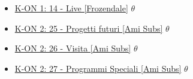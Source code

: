 \begin{itemize}
				\item \href{https://mega.nz/#!xlcAUIoD!Nb41nOrmFOCD4II2LrOPH6mZMtVmeiWKCxQsop_9aHE} {K-ON 1: 14 - Live [Frozendale]}  $\theta$   \\ 
				\item \href{https://mega.nz/#!o1s1QI6C!SkVhofqBQ4_AinhHwyUThTN1iHkAxTZGN9dWpYFbClo}
				 {K-ON 2: 25 - Progetti futuri [Ami Subs]}  $\theta$   \\
				\item \href{https://mega.nz/#!lp1AyYxK!OXkte8mQEa13L6RWr_50jojJB4hoEe_QnJYb4DtkWTY} {K-ON 2: 26 - Visita [Ami Subs]}  $\theta$   \\
				\item \href{https://mega.nz/#!h0UySaDa!N5UCU0sZOuvSC5cHDWecikA7jtg4iL8y42ZAqzr7Nxo} {K-ON 2: 27 - Programmi Speciali [Ami Subs]}  $\theta$   \\
				
			
			\end{itemize}
		
		
